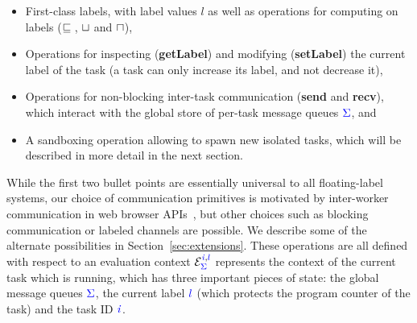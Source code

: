 \documentclass{sigplanconf}
\newcommand{\Varid}[1]{\mathit{#1}}
\begin{document}
\begin{itemize}
    \item First-class labels, with label values $l$ as well as operations for computing on
labels (\ensuremath{\flows{}}, \ensuremath{\lub} and \ensuremath{\glb}),
    \item Operations for inspecting (\textbf{getLabel}) and modifying (\textbf{setLabel}) the current label of the task (a task can only increase its label, and not decrease it),
    \item Operations for non-blocking inter-task communication (\textbf{send} and \textbf{recv}),
        which interact with the global store of per-task message queues \ensuremath{\ifc{\Sigma}}, and
    \item A sandboxing operation allowing to spawn new
    isolated tasks, which will be described in more detail in the
    next section.
\end{itemize}

While the first two bullet points are essentially universal to all
floating-label systems, our choice of communication primitives is motivated
by inter-worker communication in web browser APIs~\cite{webworkers}, but
other choices such as blocking communication or labeled channels are possible.
We describe some of the alternate possibilities in Section~\ref{sec:extensions}.
These operations are all defined with respect to an evaluation context \ensuremath{\mathcal{E}_{\ifc{\Sigma}}^{\ifc{\Varid{i}},\ifc{l}}} represents the context
of the current task which is running, which has three important pieces
of state: the global message queues \ensuremath{\ifc{\Sigma}},
the current label \ensuremath{\ifc{l}} (which protects the program counter of the task)
and the task ID \ensuremath{\ifc{\Varid{i}}}.
\end{document}
